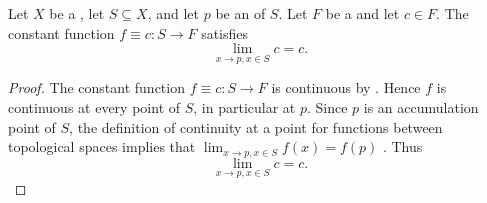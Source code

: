 \begin{corollary} \label{corollary:limit_of_constant_function_on_topological_space_valued_in_topological_field_at_accumulation_point}
    Let $X$ be a , let $S \subseteq X$, and let $p$ be an  of $S$. Let $F$ be a  and let $c \in F$. The constant function $f \equiv c : S \to F$ satisfies
    $$\lim_{x \to p, x \in S} c = c.$$
\end{corollary}
\begin{proof}
    The constant function $f \equiv c : S \to F$ is continuous by . Hence $f$ is continuous at every point of $S$, in particular at $p$. Since $p$ is an accumulation point of $S$, the definition of continuity at a point for functions between topological spaces implies that $\lim_{x \to p, x \in S} f(x) = f(p)$ . Thus
    $$\lim_{x \to p, x \in S} c = c.$$
\end{proof}
